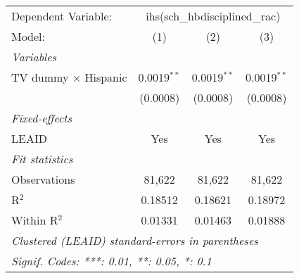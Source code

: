 \begin{tabular}{lccc}
\tabularnewline\midrule\midrule
Dependent Variable:&\multicolumn{3}{c}{ihs(sch\_hbdisciplined\_rac)}\\
Model:&(1) & (2) & (3)\\
\midrule \emph{Variables}&   &   &  \\
TV dummy $\times$ Hispanic & 0.0019$^{**}$ & 0.0019$^{**}$ & 0.0019$^{**}$\\
  &(0.0008) & (0.0008) & (0.0008)\\
\midrule \emph{Fixed-effects}&   &   &  \\
LEAID & Yes & Yes & Yes\\
\midrule \emph{Fit statistics}&  & & \\
Observations & 81,622&81,622&81,622\\
R$^2$ & 0.18512&0.18621&0.18972\\
Within R$^2$ & 0.01331&0.01463&0.01888\\
\midrule\midrule\multicolumn{4}{l}{\emph{Clustered (LEAID) standard-errors in parentheses}}\\
\multicolumn{4}{l}{\emph{Signif. Codes: ***: 0.01, **: 0.05, *: 0.1}}\\
\end{tabular}


